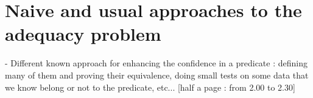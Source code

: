 \section{Naive and usual approaches to the adequacy problem}



- Different known approach for enhancing the confidence in a predicate : defining many of them and proving their equivalence, doing small tests on some data that we know belong or not to the predicate, etc... 
[half a page : from 2.00 to 2.30]



